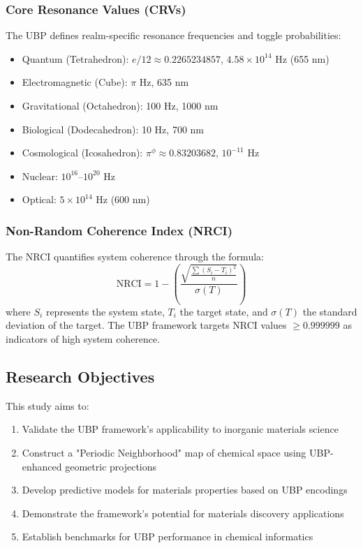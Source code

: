\documentclass[12pt,a4paper]{article}
\begin{document}
\subsubsection{Core Resonance Values (CRVs)}
The UBP defines realm-specific resonance frequencies and toggle probabilities:
\begin{itemize}
    \item Quantum (Tetrahedron): $e/12 \approx 0.2265234857$, $4.58 \times 10^{14}$ Hz (655 nm)
    \item Electromagnetic (Cube): $\pi$ Hz, 635 nm
    \item Gravitational (Octahedron): 100 Hz, 1000 nm
    \item Biological (Dodecahedron): 10 Hz, 700 nm
    \item Cosmological (Icosahedron): $\pi^\phi \approx 0.83203682$, $10^{-11}$ Hz
    \item Nuclear: $10^{16}$--$10^{20}$ Hz
    \item Optical: $5 \times 10^{14}$ Hz (600 nm)
\end{itemize}

\subsubsection{Non-Random Coherence Index (NRCI)}
The NRCI quantifies system coherence through the formula:
\begin{equation}
\text{NRCI} = 1 - \left( \frac{\sqrt{\frac{\sum (S_i - T_i)^2}{n}}}{\sigma(T)} \right)
\end{equation}
where $S_i$ represents the system state, $T_i$ the target state, and $\sigma(T)$ the standard deviation of the target. The UBP framework targets NRCI values $\geq 0.999999$ as indicators of high system coherence.

\subsection{Research Objectives}

This study aims to:
\begin{enumerate}
    \item Validate the UBP framework's applicability to inorganic materials science
    \item Construct a "Periodic Neighborhood" map of chemical space using UBP-enhanced geometric projections
    \item Develop predictive models for materials properties based on UBP encodings
    \item Demonstrate the framework's potential for materials discovery applications
    \item Establish benchmarks for UBP performance in chemical informatics
\end{enumerate}
\end{document}
